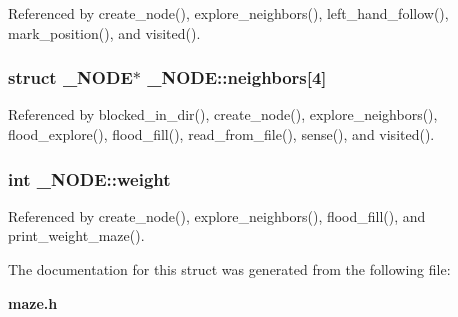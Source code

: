 Referenced by create\-\_\-node(), explore\-\_\-neighbors(), left\-\_\-hand\-\_\-follow(), mark\-\_\-position(), and visited().

\subsubsection[{neighbors}]{\setlength{\rightskip}{0pt plus 5cm}struct {\bf \-\_\-\-N\-O\-D\-E}$\ast$ \-\_\-\-N\-O\-D\-E\-::neighbors[4]}\label{struct__NODE_ab474f61f2dea616a934f16db645e83b0}


Referenced by blocked\-\_\-in\-\_\-dir(), create\-\_\-node(), explore\-\_\-neighbors(), flood\-\_\-explore(), flood\-\_\-fill(), read\-\_\-from\-\_\-file(), sense(), and visited().

\subsubsection[{weight}]{\setlength{\rightskip}{0pt plus 5cm}int \-\_\-\-N\-O\-D\-E\-::weight}\label{struct__NODE_af4551dec0caa61f0b95a8cd025a73afa}


Referenced by create\-\_\-node(), explore\-\_\-neighbors(), flood\-\_\-fill(), and print\-\_\-weight\-\_\-maze().



The documentation for this struct was generated from the following file\-:\begin{DoxyCompactItemize}
\item 
{\bf maze.\-h}\end{DoxyCompactItemize}

